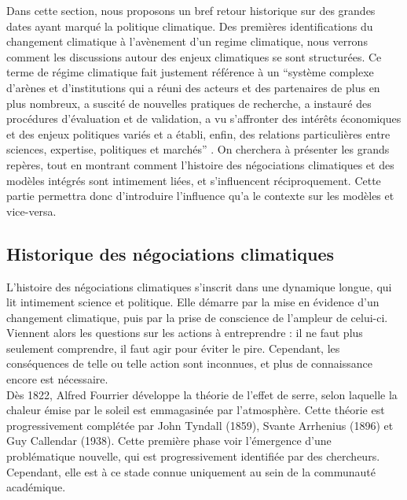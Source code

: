 Dans cette section, nous proposons un bref retour historique sur des grandes dates ayant marqué la politique climatique. Des premières identifications du changement climatique à l'avènement d'un \gls{regime climatique}, nous verrons comment les discussions autour des enjeux climatiques se sont structurées. Ce terme de régime climatique fait justement référence à un  \enquote{système complexe d’arènes et d’institutions qui a réuni des acteurs et des partenaires de plus en plus nombreux, a suscité de nouvelles pratiques de recherche, a instauré des procédures d’évaluation et de validation, a vu s’affronter des intérêts économiques et des enjeux politiques variés et a établi, enfin, des relations particulières entre sciences, expertise, politiques et marchés} \autocite{aykut_gouverner_2015}. On cherchera à présenter les grands repères, tout en montrant comment l'histoire des négociations climatiques et des modèles intégrés sont intimement liées, et s'influencent réciproquement. Cette partie permettra donc d'introduire l'influence qu'a le contexte sur les modèles et vice-versa. 


\subsection{Historique des négociations climatiques}
\label{sect:1.2.1}

L'histoire des négociations climatiques s'inscrit dans une dynamique longue, qui lit intimement science et politique. Elle démarre par la mise en évidence d'un changement climatique, puis par la prise de conscience de l'ampleur de celui-ci. Viennent alors les questions sur les actions à entreprendre : il ne faut plus seulement comprendre, il faut agir pour éviter le pire. Cependant, les conséquences de telle ou telle action sont inconnues, et plus de connaissance encore est nécessaire. \\

Dès 1822, Alfred Fourrier développe la théorie de l'effet de serre, selon laquelle la chaleur émise par le soleil est emmagasinée par l'atmosphère. Cette théorie est progressivement complétée par John Tyndall (1859), Svante Arrhenius (1896) et Guy Callendar (1938). Cette première phase voir l'émergence d'une problématique nouvelle, qui est progressivement identifiée par des chercheurs. Cependant, elle est à ce stade connue uniquement au sein de la communauté académique. \\


